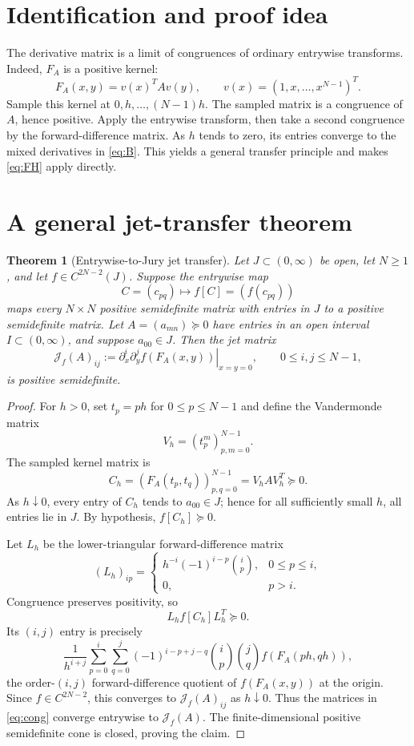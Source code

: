 \documentclass[11pt]{article}
\newtheorem{theorem}{Theorem}
\begin{document}
\section{Identification and proof idea}

The derivative matrix is a limit of congruences of ordinary entrywise
transforms. Indeed, $F_A$ is a positive kernel:
\[
 F_A(x,y)=v(x)^TAv(y),
 \qquad v(x)=(1,x,\ldots,x^{N-1})^T.
\]
Sample this kernel at $0,h,\ldots,(N-1)h$. The sampled matrix is a congruence
of $A$, hence positive. Apply the entrywise transform, then take a second
congruence by the forward-difference matrix. As $h$ tends to zero, its entries
converge to the mixed derivatives in \eqref{eq:B}. This yields a general
transfer principle and makes \eqref{eq:FH} apply directly.

\section{A general jet-transfer theorem}

\begin{theorem}[Entrywise-to-Jury jet transfer]\label{thm:transfer}
Let $J\subset(0,\infty)$ be open, let $N\ge1$, and let
$f\in C^{2N-2}(J)$. Suppose the entrywise map
\[
 C=(c_{pq})\longmapsto f[C]=(f(c_{pq}))
\]
maps every $N\times N$ positive semidefinite matrix with entries in $J$ to a
positive semidefinite matrix. Let $A=(a_{mn})\succeq0$ have entries in an
open interval $I\subset(0,\infty)$, and suppose $a_{00}\in J$. Then the jet
matrix
\[
 \mathcal J_f(A)_{ij}
 :=\left.\partial_x^i\partial_y^j f(F_A(x,y))\right|_{x=y=0},
 \qquad 0\le i,j\le N-1,
\]
is positive semidefinite.
\end{theorem}

\begin{proof}
For $h>0$, set $t_p=ph$ for $0\le p\le N-1$ and define the Vandermonde
matrix
\[
 V_h=(t_p^m)_{p,m=0}^{N-1}.
\]
The sampled kernel matrix is
\begin{equation}\label{eq:sample}
 C_h=(F_A(t_p,t_q))_{p,q=0}^{N-1}=V_hAV_h^T\succeq0.
\end{equation}
As $h\downarrow0$, every entry of $C_h$ tends to $a_{00}\in J$; hence for
all sufficiently small $h$, all entries lie in $J$. By hypothesis,
$f[C_h]\succeq0$.

Let $L_h$ be the lower-triangular forward-difference matrix
\[
 (L_h)_{ip}=
 \begin{cases}
 h^{-i}(-1)^{i-p}\binom{i}{p},&0\le p\le i,\\
 0,&p>i.
 \end{cases}
\]
Congruence preserves positivity, so
\begin{equation}\label{eq:cong}
 L_hf[C_h]L_h^T\succeq0.
\end{equation}
Its $(i,j)$ entry is precisely
\[
 \frac{1}{h^{i+j}}
 \sum_{p=0}^i\sum_{q=0}^j
 (-1)^{i-p+j-q}\binom{i}{p}\binom{j}{q}
 f(F_A(ph,qh)),
\]
the order-$(i,j)$ forward-difference quotient of $f(F_A(x,y))$ at the
origin. Since $f\in C^{2N-2}$, this converges to
$\mathcal J_f(A)_{ij}$ as $h\downarrow0$. Thus the matrices in
\eqref{eq:cong} converge entrywise to $\mathcal J_f(A)$. The finite-dimensional
positive semidefinite cone is closed, proving the claim.
\end{proof}
\end{document}
